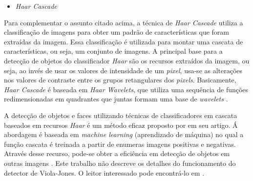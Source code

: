 \begin{itemize}
\raggedright \item \textit{Haar Cascade}
\end{itemize}
 
Para complementar o assunto citado acima, a técnica de \textit{Haar Cascade} utiliza a classificação de imagens para obter um padrão de características que foram extraídas da imagem. Essa classificação é utilizada para montar uma cascata de características, ou seja, um conjunto de imagens. A principal base para a detecção de objetos do classificador \textit{Haar} são os recursos extraídos da imagem, ou seja, ao invés de usar os valores de intensidade de um \textit{pixel}, usa-se as alterações nos valores de contraste entre os grupos retangulares dos \textit{pixels}. Basicamente, \textit{Haar Cascade} é baseada em \textit{Haar Wavelets}, que utiliza uma sequência de funções redimensionadas em quadrantes que juntas formam uma base de \textit{wavelets} \cite{WILSON2006}.

A detecção de objetos e faces utilizando técnicas de classificadores em cascata baseados em recursos \textit{Haar} é um método eficaz proposto por  em seu artigo. Á abordagem é baseada em \textit{machine learning} (aprendizado de máquina) no qual a função cascata é treinada a partir de enumeras imagens positivas e negativas. Através desse recurso, pode-se obter a eficiência em detecção de objetos em outras imagens \cite{OpenCV}. Este trabalho não descreve os detalhes do funcionamento do detector de Viola-Jones. O leitor interessado pode encontrá-lo em \cite{VIOLA2001}.